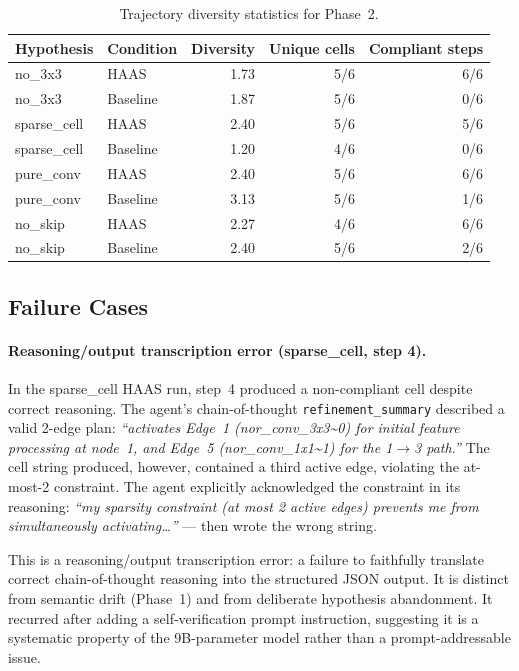 \documentclass[10pt]{article}
\newcommand{\haas}{\textsc{HAAS}}
\begin{document}
\begin{table}[t]
\caption{Trajectory diversity statistics for Phase~2.}
\label{tab:diversity}
\begin{center}
\small
\begin{tabular}{llrrr}
\toprule
\textbf{Hypothesis} & \textbf{Condition} & \textbf{Diversity} &
                      \textbf{Unique cells} & \textbf{Compliant steps} \\
\midrule
no\_3x3      & \haas{}   & 1.73 & 5/6 & 6/6 \\
no\_3x3      & Baseline  & 1.87 & 5/6 & 0/6 \\
sparse\_cell & \haas{}   & 2.40 & 5/6 & 5/6 \\
sparse\_cell & Baseline  & 1.20 & 4/6 & 0/6 \\
pure\_conv   & \haas{}   & 2.40 & 5/6 & 6/6 \\
pure\_conv   & Baseline  & 3.13 & 5/6 & 1/6 \\
no\_skip     & \haas{}   & 2.27 & 4/6 & 6/6 \\
no\_skip     & Baseline  & 2.40 & 5/6 & 2/6 \\
\bottomrule
\end{tabular}
\end{center}
\end{table}

\subsection{Failure Cases}
\label{sec:phase2-failures}

\paragraph{Reasoning/output transcription error (sparse\_cell, step 4).}
In the sparse\_cell \haas{} run, step~4 produced a non-compliant cell
despite correct reasoning. The agent's chain-of-thought \texttt{refinement\_summary}
described a valid 2-edge plan: \emph{``activates Edge~1 (nor\_conv\_3x3\textasciitilde0)
for initial feature processing at node~1, and Edge~5 (nor\_conv\_1x1\textasciitilde1)
for the 1$\to$3 path.''} The cell string produced, however, contained a third
active edge, violating the at-most-2 constraint. The agent explicitly
acknowledged the constraint in its reasoning: \emph{``my sparsity constraint
(at most 2 active edges) prevents me from simultaneously activating\ldots''} ---
then wrote the wrong string.

This is a reasoning/output transcription error: a failure to faithfully
translate correct chain-of-thought reasoning into the structured JSON output.
It is distinct from semantic drift (Phase~1) and from deliberate hypothesis
abandonment. It recurred after adding a self-verification prompt instruction,
suggesting it is a systematic property of the 9B-parameter model rather than
a prompt-addressable issue.
\end{document}
